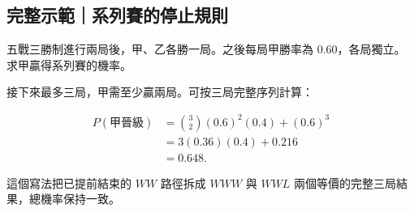 \documentclass[11pt,a4paper]{article}
\begin{document}
\begin{HandoutWorkedExample}

\subsection{完整示範｜系列賽的停止規則}\label{ux5b8cux6574ux793aux7bc4ux7cfbux5217ux8cfdux7684ux505cux6b62ux898fux5247}

五戰三勝制進行兩局後，甲、乙各勝一局。之後每局甲勝率為 \(0.60\)，各局獨立。求甲贏得系列賽的機率。

接下來最多三局，甲需至少贏兩局。可按三局完整序列計算：

\[
\begin{aligned}
P(\text{甲晉級})
&=\binom32(0.6)^2(0.4)+(0.6)^3\\
&=3(0.36)(0.4)+0.216\\
&=\boxed{0.648}.
\end{aligned}
\]

這個寫法把已提前結束的 \(WW\) 路徑拆成 \(WWW\) 與 \(WWL\) 兩個等價的完整三局結果，總機率保持一致。

\end{HandoutWorkedExample}
\end{document}
